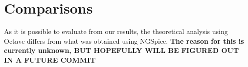 \section{Comparisons}
\label{sec:comparisons}

As it is possible to evaluate from our results, the theoretical analysis using Octave differs from what was obtained using NGSpice. \textbf{The reason for this is currently unknown, BUT HOPEFULLY WILL BE FIGURED OUT IN A FUTURE COMMIT}

